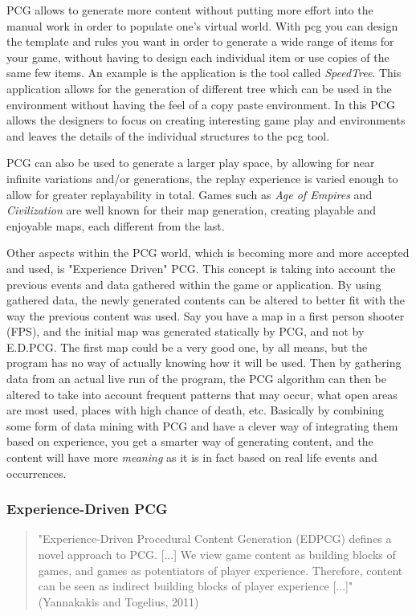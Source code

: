 PCG allows to generate more content without putting more effort into the manual work in order to populate one's virtual world. With pcg you can design the template and rules you want in order to generate a wide range of items for your game, without having to design each individual item or use copies of the same few items. An example is the application is the tool called \textit{SpeedTree}. This application allows for the generation of different tree which can be used in the environment without having the feel of a copy paste environment. In this PCG allows the designers to focus on creating interesting game play and environments and leaves the details of the individual structures to the pcg tool. 

PCG can also be used to generate a larger play space, by allowing for near infinite variations and/or generations, the replay experience is varied enough to allow for greater replayability in total. Games such as \textit{Age of Empires} and \textit{Civilization} are well known for their map generation, creating playable and enjoyable maps, each different from the last.


Other aspects within the PCG world, which is becoming more and more accepted and used, is "Experience Driven" PCG\cite{art:exppcg}. This concept is taking into account the previous events and data gathered within the game or application. By using gathered data, the newly generated contents can be altered to better fit with the way the previous content was used. Say you have a map in a first person shooter (FPS), and the initial map was generated statically by PCG, and not by E.D.PCG. The first map could be a very good one, by all means, but the program has no way of actually knowing how it will be used. Then by gathering data from an actual live run of the program, the PCG algorithm can then be altered to take into account frequent patterns that may occur, what open areas are most used, places with high chance of death, etc. Basically by combining some form of data mining with PCG and have a clever way of integrating them based on experience, you get a smarter way of generating content, and the content will have more \textit{meaning} as it is in fact based on real life events and occurrences.

\subsubsection{Experience-Driven PCG}
\begin{quotation} 
"Experience-Driven Procedural Content Generation (EDPCG) defines a novel approach to PCG. [...] We view game content as building blocks of games, and games as potentiators of player experience. Therefore, content can be seen as indirect building blocks of player experience [...]" (Yannakakis and Togelius, 2011) \cite{art:edpcg}
\end{quotation}

